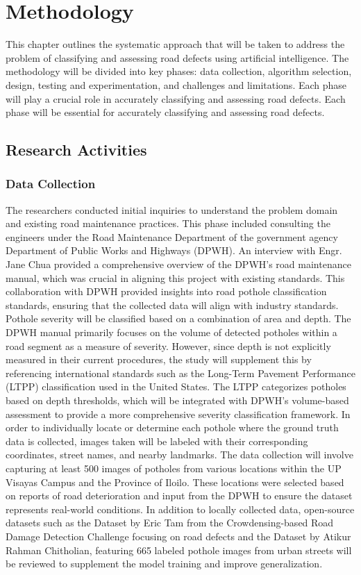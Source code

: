 \chapter{Methodology}
This chapter outlines the systematic approach that will be taken to address the problem of classifying and assessing road defects using artificial intelligence. The methodology will be divided into key phases: data collection, algorithm selection, design, testing and experimentation, and challenges and limitations. Each phase will play a crucial role in accurately classifying and assessing road defects.  Each phase will be essential for accurately classifying and assessing road defects. 

\section{\textbf{ Research Activities} }

\subsection{\textbf{Data Collection} }
The researchers conducted initial inquiries to understand the problem domain and existing road maintenance practices. This phase included consulting the engineers under the Road Maintenance Department of the government agency Department of Public Works and Highways (DPWH). An interview with Engr. Jane Chua provided a comprehensive overview of the DPWH's road maintenance manual, which was crucial in aligning this project with existing standards. This collaboration with DPWH provided insights into road pothole classification standards, ensuring that the collected data will align with industry standards. Pothole severity will be classified based on a combination of area and depth. The DPWH manual primarily focuses on the volume of detected potholes within a road segment as a measure of severity. However, since depth is not explicitly measured in their current procedures, the study will supplement this by referencing international standards such as the Long-Term Pavement Performance (LTPP) classification used in the United States. The LTPP categorizes potholes based on depth thresholds, which will be integrated with DPWH’s volume-based assessment to provide a more comprehensive severity classification framework. In order to individually locate or determine each pothole where the ground truth data is collected, images taken will be labeled with their corresponding coordinates, street names, and nearby landmarks. The data collection will involve capturing at least 500 images of potholes from various locations within the UP Visayas Campus and the Province of Iloilo. These locations were selected based on reports of road deterioration and input from the DPWH to ensure the dataset represents real-world conditions.  In addition to locally collected data, open-source datasets such as the Dataset by Eric Tam from the Crowdensing-based Road Damage Detection Challenge focusing on road defects and the Dataset by Atikur Rahman Chitholian, featuring 665 labeled pothole images from urban streets will be reviewed to supplement the model training and improve generalization.



